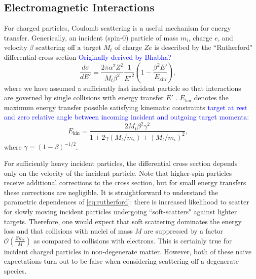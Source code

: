 \documentclass[twocolumn,showpacs,preprintnumbers,amsmath,amssymb,prl]{revtex4}
\newcommand{\OO}{\mathcal{O}}
\def\r{\right)}
\def\l{\left(}
\begin{document}
\subsection{Electromagnetic Interactions}

For charged particles, Coulomb scattering is a useful mechanism for energy transfer. Generically, an incident (spin-0) particle of mass $m_i$, charge $e$, and velocity $\beta$ scattering off a target $M_t$ of charge $Ze$ is described by the ``Rutherford" differential cross section \textcolor{blue}{Originally derived by Bhabha?}
\begin{equation}
\label{eq:rutherford}
\frac{d \sigma}{dE'} = \frac{2 \pi  \alpha^2 Z^2}{M_t \beta^2} \frac{1}{E'^2} \l1- \frac{\beta^2 E'}{E_{\text{kin}}}\r,
 \end{equation}
where we have assumed a sufficiently fast incident particle so that interactions are governed by single collisions with energy transfer $E'$ \cite{Agashe:2014kda}. $E_{\text{kin}}$ denotes the maximum energy transfer possible satisfying kinematic constraints \textcolor{blue}{target at rest and zero relative angle between incoming incident and outgoing target momenta}:
\begin{equation}
E_{\text{kin}} = \frac{2 M_t \beta^2 \gamma^2}{1+ 2\gamma(M_t/m_i) +(M_t/m_i)^2},
\end{equation}
where $\gamma = (1-\beta)^{-1/2}$.

For sufficiently heavy incident particles, the differential cross section depends only on the velocity of the incident particle. Note that higher-spin particles receive additional corrections to the cross section, but for small energy transfers these corrections are negligible. It is straightforward to understand the parametric dependences of \eqref{eq:rutherford}: there is increased likelihood to scatter for slowly moving incident particles undergoing ``soft-scatters" against lighter targets. Therefore, one would expect that soft scattering dominates the energy loss and that collisions with nuclei of mass $M$ are suppressed by a factor $\OO\l\frac{Z m_e}{M}\r$ as compared to collisions with electrons. This is certainly true for incident charged particles in non-degenerate matter. However, both of these naive expectations turn out to be false when considering scattering off a degenerate species.
\end{document}
